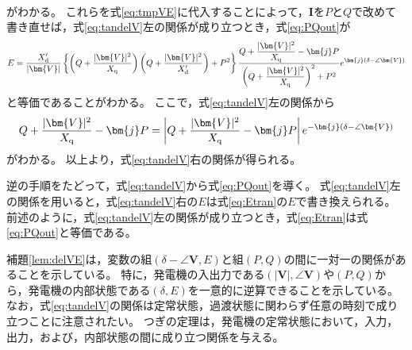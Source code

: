 \documentclass[tombow,dvipdfmx]{corona-a5}
\begin{document}
\begin{証明}
\begin{align*}
\end{align*}
がわかる。
これらを式\ref{eq:tmpVE}に代入することによって，$\bm{I}$を$P$と$Q$で改めて書き直せば，式\ref{eq:tandelV}左の関係が成り立つとき，式\ref{eq:PQout}が
\begin{align}\label{eq:Etran}
E=
\frac{X_{\rm d}'}{|\bm{V}| } 
\left\{
\left(Q + \frac{|\bm{V}|^2}{X_{\rm q}} \right) \left(Q + \frac{|\bm{V}|^2}{X_{\rm d}'} \right) +P^2
\right\}
\frac{  Q + \frac{|\bm{V}|^2}{X_{\rm q}} - \bm{j} P }
{   \left( Q + \frac{|\bm{V}|^2}{X_{\rm q}} \right)^2 + P^2   }
e^{\bm{j}(\delta - \angle \bm{V})}
\end{align}
と等価であることがわかる。
ここで，式\ref{eq:tandelV}左の関係から
\begin{align*}
Q + \frac{|\bm{V}|^2}{X_{\rm q}} - \bm{j} P
= 
\left|Q + \frac{|\bm{V}|^2}{X_{\rm q}} - \bm{j} P \right|
e^{-\bm{j}(\delta - \angle \bm{V})}
\end{align*}
がわかる。
以上より，式\ref{eq:tandelV}右の関係が得られる。

逆の手順をたどって，式\ref{eq:tandelV}から式\ref{eq:PQout}を導く。
式\ref{eq:tandelV}左の関係を用いると，式\ref{eq:tandelV}右の$E$は式\ref{eq:Etran}の$E$で書き換えられる。
前述のように，式\ref{eq:tandelV}左の関係が成り立つとき，式\ref{eq:Etran}は式\ref{eq:PQout}と等価である。
\end{証明}

補題\ref{lem:delVE}は，変数の組$(\delta - \angle \bm{V},E)$と組$(P,Q)$の間に一対一の関係があることを示している。
特に，発電機の入出力である$(|\bm{V}|,\angle \bm{V})$や$(P,Q)$から，発電機の内部状態である$(\delta,E)$を一意的に逆算できることを示している。
なお，式\ref{eq:tandelV}の関係は定常状態，過渡状態に関わらず任意の時刻で成り立つことに注意されたい。
つぎの定理は，発電機の定常状態において，入力，出力，および，内部状態の間に成り立つ関係を与える。
\end{document}
